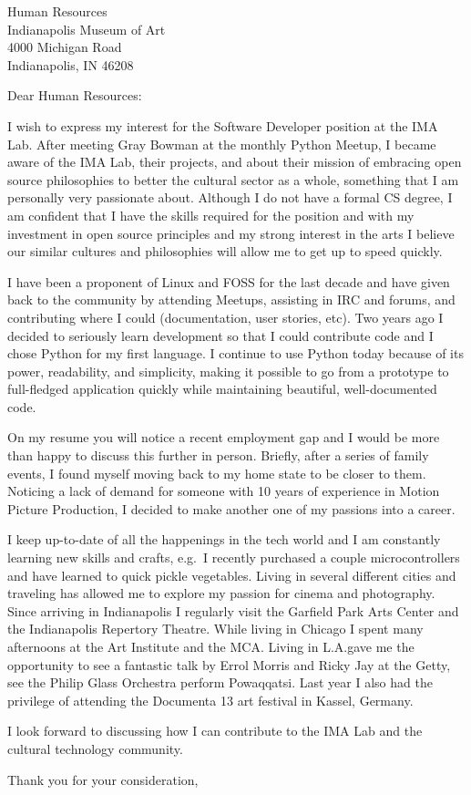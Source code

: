 \documentclass[letterpaper]{letter}        %
\begin{document}

\begin{letter}{%
  Human Resources\\
  Indianapolis Museum of Art\\
  4000 Michigan Road\\
  Indianapolis, IN 46208%
  }

  \opening{Dear Human Resources:}
I wish to express my interest for the Software Developer position at the IMA Lab.  After meeting Gray Bowman at the monthly Python Meetup, I became aware of the IMA Lab, their projects, and about their mission of embracing open source philosophies to better the cultural sector as a whole, something that I am personally very passionate about.  Although I do not have a formal CS degree, I am confident that I have the skills required for the position and with my investment in open source principles and my strong interest in the arts I believe our similar cultures and philosophies will allow me to get up to speed quickly.

I have been a proponent of Linux and FOSS for the last decade and have given back to the community by attending Meetups, assisting in IRC and forums, and contributing where I could (documentation, user stories, etc).  Two years ago I decided to seriously learn development so that I could contribute code and I chose Python for my first language.  I continue to use Python today because of its power, readability, and simplicity, making it possible to go from a prototype to full-fledged application quickly while maintaining beautiful, well-documented code.

On my resume you will notice a recent employment gap and I would be more than happy to discuss this further in person.  Briefly, after a series of family events, I found myself moving back to my home state to be closer to them.  Noticing a lack of demand for someone with 10 years of experience in Motion Picture Production, I decided to make another one of my passions into a career.

I keep up-to-date of all the happenings in the tech world and I am constantly learning new skills and crafts, e.g.\, I recently purchased a couple microcontrollers and have learned to quick pickle vegetables.  Living in several different cities and traveling has allowed me to explore my passion for cinema and photography.  Since arriving in Indianapolis I regularly visit the Garfield Park Arts Center and the Indianapolis Repertory Theatre.  While living in Chicago I spent many afternoons at the Art Institute and the MCA. Living in L.A.\@ gave me the opportunity to see a fantastic talk by Errol Morris and Ricky Jay at the Getty, see the Philip Glass Orchestra perform Powaqqatsi. Last year I also had the privilege of attending the Documenta 13 art festival in Kassel, Germany.

I look forward to discussing how I can contribute to the IMA Lab and the cultural technology community.
\closing{Thank you for your consideration,}


\end{letter}
\end{document}
